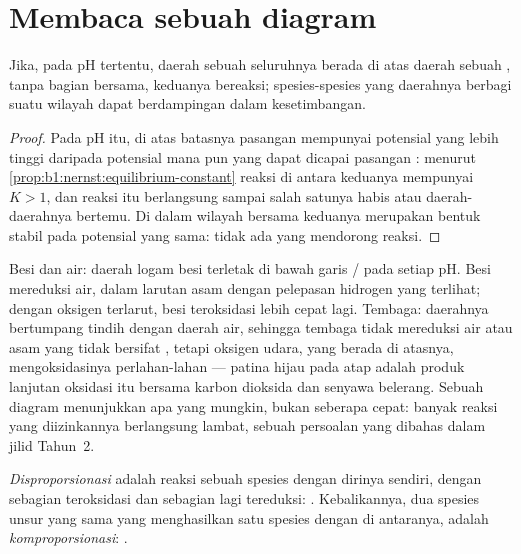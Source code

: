 \section{Membaca sebuah diagram}\label{sec:b1:e-ph-diagrams:reading}

\begin{proposition}\label{prop:b1:e-ph-diagrams:disjoint-domains}
Jika, pada pH tertentu, daerah sebuah  seluruhnya berada di atas
daerah sebuah , tanpa bagian bersama, keduanya bereaksi;
spesies-spesies yang daerahnya berbagi suatu wilayah dapat berdampingan
dalam kesetimbangan.
\end{proposition}

\begin{proof}
Pada pH itu, di atas batasnya pasangan  mempunyai potensial yang
lebih tinggi daripada potensial mana pun yang dapat dicapai pasangan
: menurut \cref{prop:b1:nernst:equilibrium-constant} reaksi di
antara keduanya mempunyai $K > 1$, dan reaksi itu berlangsung sampai
salah satunya habis atau daerah-daerahnya bertemu. Di dalam wilayah
bersama keduanya merupakan bentuk stabil pada potensial yang sama: tidak
ada yang mendorong reaksi.
\end{proof}

Besi dan air: daerah logam besi terletak di bawah garis /
pada setiap pH. Besi mereduksi air, dalam larutan asam dengan pelepasan
hidrogen yang terlihat; dengan oksigen terlarut, besi teroksidasi lebih
cepat lagi. Tembaga: daerahnya bertumpang tindih dengan daerah air,
sehingga tembaga tidak mereduksi air atau asam yang tidak bersifat
, tetapi oksigen udara, yang berada di atasnya, mengoksidasinya
perlahan-lahan --- patina hijau pada atap adalah produk lanjutan oksidasi
itu bersama karbon dioksida dan senyawa belerang. Sebuah diagram
menunjukkan apa yang mungkin, bukan seberapa cepat: banyak reaksi yang
diizinkannya berlangsung lambat, sebuah persoalan yang dibahas dalam
jilid Tahun~2.

\begin{definition}\label{def:b1:e-ph-diagrams:disproportionation}
\emph{Disproporsionasi} adalah reaksi sebuah
spesies dengan dirinya sendiri, dengan sebagian teroksidasi dan sebagian
lagi tereduksi: . Kebalikannya, dua spesies unsur
yang sama yang menghasilkan satu spesies dengan  di
antaranya, adalah \emph{komproporsionasi}:
.
\end{definition}

